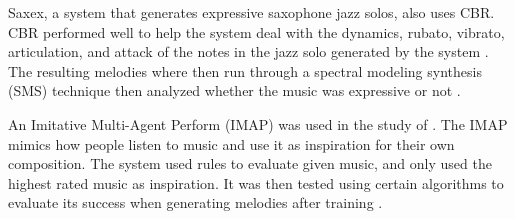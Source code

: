 Saxex, a system that generates expressive saxophone jazz solos, also uses CBR. CBR performed well to help the system deal with the dynamics, rubato, vibrato, articulation, and attack of the notes in the jazz solo generated by the system \citep{arcos1998saxex}. The resulting melodies where then run through a spectral modeling synthesis (SMS) technique then analyzed whether the music was expressive or not \citep{arcos1998saxex}.

An Imitative Multi-Agent Perform (IMAP) was used in the study of \citet{miranda2010artificial}. The IMAP mimics how people listen to music and use it as inspiration for their own composition. The system used rules to evaluate given music, and only used the highest rated music as inspiration. It was then tested using certain algorithms to evaluate its success when generating melodies after training \citep{miranda2010artificial}.




